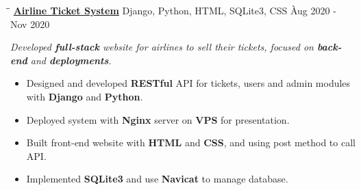 \documentclass{res}
\begin{document}
\begin{resume}
    \vspace{0.00in}
    \begin{tabbing}
    \hspace{2.391in}\= \hspace{3in}\= \kill %
    \href{https://github.com/DolorHunter/AirlineTicketSystem}{\bf Airline Ticket System}  \> 
                Django, Python, HTML, SQLite3, CSS \` Aug 2020 - Nov 2020 \\
    \end{tabbing}\vspace{-20pt}      %
    \vspace{-0.1in}
    \textit{Developed {\bf full-stack} website for airlines to sell their tickets, 
                focused on {\bf back-end} and {\bf deployments}.}
    \vspace{+0.05in}
    \begin{itemize} \itemsep 1.5pt %
        \item Designed and developed {\bf RESTful} API for tickets, users and admin modules with 
                {\bf Django} and {\bf Python}.
        \item Deployed system with {\bf Nginx} server on {\bf VPS} for presentation.
        \item Built front-end website with {\bf HTML} and {\bf CSS}, and using post method 
                to call API.
        \item Implemented {\bf SQLite3} and use {\bf Navicat} to manage database.
    \end{itemize}

\end{resume}
\end{document}
